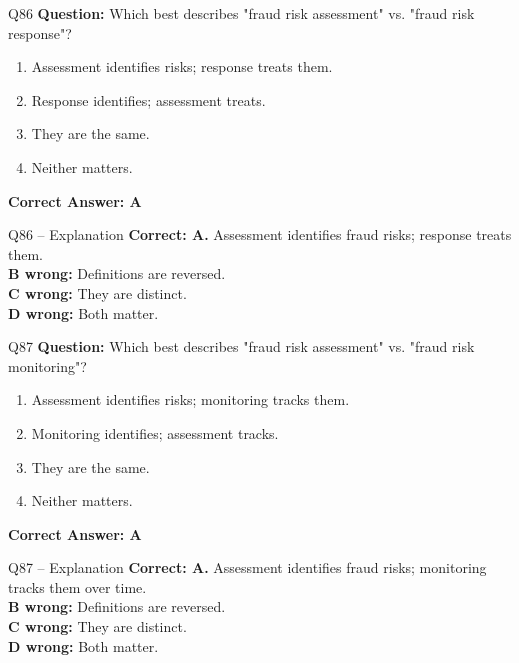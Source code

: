 \documentclass[aspectratio=169,10pt]{beamer}
\begin{document}
	\begin{frame}[t]{Q86}
		\small
		\textbf{Question:} Which best describes "fraud risk assessment" vs. "fraud risk response"?
		\begin{enumerate}[label=\Alph*.,itemsep=1pt,topsep=2pt]
			\item Assessment identifies risks; response treats them.
			\item Response identifies; assessment treats.
			\item They are the same.
			\item Neither matters.
		\end{enumerate}
		\vspace{4pt}
		\textbf{Correct Answer: A}
	\end{frame}
	
	\begin{frame}[t]{Q86 -- Explanation}
		\small
		\textbf{Correct: A.} Assessment identifies fraud risks; response treats them. \\[4pt]
		\textbf{B wrong:} Definitions are reversed. \\[2pt]
		\textbf{C wrong:} They are distinct. \\[2pt]
		\textbf{D wrong:} Both matter.
	\end{frame}
	
	\begin{frame}[t]{Q87}
		\small
		\textbf{Question:} Which best describes "fraud risk assessment" vs. "fraud risk monitoring"?
		\begin{enumerate}[label=\Alph*.,itemsep=1pt,topsep=2pt]
			\item Assessment identifies risks; monitoring tracks them.
			\item Monitoring identifies; assessment tracks.
			\item They are the same.
			\item Neither matters.
		\end{enumerate}
		\vspace{4pt}
		\textbf{Correct Answer: A}
	\end{frame}
	
	\begin{frame}[t]{Q87 -- Explanation}
		\small
		\textbf{Correct: A.} Assessment identifies fraud risks; monitoring tracks them over time. \\[4pt]
		\textbf{B wrong:} Definitions are reversed. \\[2pt]
		\textbf{C wrong:} They are distinct. \\[2pt]
		\textbf{D wrong:} Both matter.
	\end{frame}
	
\end{document}
